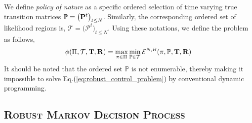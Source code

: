 We define \textit{policy of nature} as a specific ordered selection of time varying true transition matrices 
$\mathbb{P} = \big( {\mathbf{P}}^t \big)_{t \leq N}$.
Similarly, the corresponding ordered set of likelihood regions is,
$\mathcal{T} = \big(\mathcal{P}^t \big)_{t \leq N}$. 
Using these notations, we define the {\robustproblem} problem as follows,
\begin{equation}
\label{eq:robust_control_problem}
\phi(\Pi, \mathcal{T}, {\mathbf{T}}, {\mathbf{R}}) = \max_{\pi \in \Pi} \min_{\mathbb{P} \in \mathcal{T}} \mathcal{E}^{N,B}(\pi, \mathbb{P}, {\mathbf{T}}, {\mathbf{R}}) \\
\end{equation}
It should be noted that the ordered set $\mathbb{P}$ is not enumerable, thereby making it impossible to solve Eq.(\ref{eq:robust_control_problem}) by conventional dynamic programming.

\iffalse
\subsection{\textsc{Robust Markov Decision Process}}

